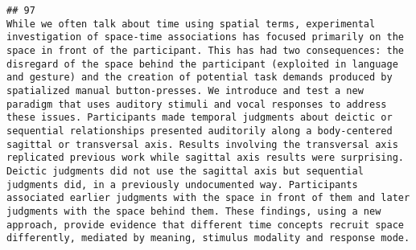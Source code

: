 \documentclass[
  english,
  man]{apa6}
\begin{document}
\begin{verbatim}
## 97                                                                                                                                                                                                                                                                                                                                                                                                                                                                                                                                                                                                                                                                                                                                                                                                                                                                                                                                                                                                                                                                                                                                                                                                                                                                                                                                                                                                                                                                             While we often talk about time using spatial terms, experimental investigation of space-time associations has focused primarily on the space in front of the participant. This has had two consequences: the disregard of the space behind the participant (exploited in language and gesture) and the creation of potential task demands produced by spatialized manual button-presses. We introduce and test a new paradigm that uses auditory stimuli and vocal responses to address these issues. Participants made temporal judgments about deictic or sequential relationships presented auditorily along a body-centered sagittal or transversal axis. Results involving the transversal axis replicated previous work while sagittal axis results were surprising. Deictic judgments did not use the sagittal axis but sequential judgments did, in a previously undocumented way. Participants associated earlier judgments with the space in front of them and later judgments with the space behind them. These findings, using a new approach, provide evidence that different time concepts recruit space differently, mediated by meaning, stimulus modality and response mode.

\end{verbatim}
\end{document}
